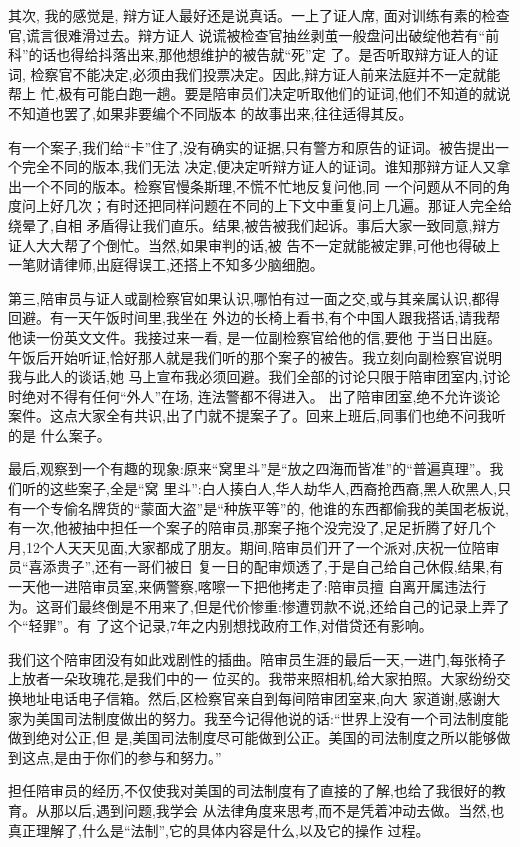 ﻿\documentclass[10pt]{article}
\begin{document}
{其次, 我的感觉是, 辩方证人最好还是说真话。一上了证人席, 面对训练有素的检查官,谎言很难滑过去。辩方证人
说谎被检查官抽丝剥茧一般盘问出破绽\myrule 他若有``前科''的话也得给抖落出来,那他想维护的被告就``死''定
了。是否听取辩方证人的证词, 检察官不能决定,必须由我们投票决定。因此,辩方证人前来法庭并不一定就能帮上
忙,极有可能白跑一趟。要是陪审员们决定听取他们的证词,他们不知道的就说不知道也罢了,如果非要编个不同版本
的故事出来,往往适得其反。

有一个案子,我们给``卡''住了,没有确实的证据,只有警方和原告的证词。被告提出一个完全不同的版本,我们无法
决定,便决定听辩方证人的证词。谁知那辩方证人又拿出一个不同的版本。检察官慢条斯理,不慌不忙地反复问他,同
一个问题从不同的角度问上好几次；有时还把同样问题在不同的上下文中重复问上几遍。那证人完全给绕晕了,自相
矛盾得让我们直乐。结果,被告被我们起诉。事后大家一致同意,辩方证人大大帮了个倒忙。当然,如果审判的话,被
告不一定就能被定罪,可他也得破上一笔财请律师,出庭得误工,还搭上不知多少脑细胞。

第三,陪审员与证人或副检察官如果认识,哪怕有过一面之交,或与其亲属认识,都得回避。有一天午饭时间里,我坐在
外边的长椅上看书,有个中国人跟我搭话,请我帮他读一份英文文件。我接过来一看, 是一位副检察官给他的信,要他
于当日出庭。午饭后开始听证,恰好那人就是我们听的那个案子的被告。我立刻向副检察官说明我与此人的谈话,她
马上宣布我必须回避。我们全部的讨论只限于陪审团室内,讨论时绝对不得有任何``外人''在场, 连法警都不得进入。
出了陪审团室,绝不允许谈论案件。这点大家全有共识,出了门就不提案子了。回来上班后,同事们也绝不问我听的是
什么案子。

最后,观察到一个有趣的现象:原来``窝里斗''是``放之四海而皆准''的``普遍真理''。我们听的这些案子,全是``窝
里斗'':白人揍白人,华人劫华人,西裔抢西裔,黑人砍黑人,只有一个专偷名牌货的``蒙面大盗''是``种族平等''的,
他谁的东西都偷我的美国老板说,有一次,他被抽中担任一个案子的陪审员,那案子拖个没完没了,足足折腾了好几个
月,12个人天天见面,大家都成了朋友。期间,陪审员们开了一个派对,庆祝一位陪审员``喜添贵子'',还有一哥们被日
复一日的配审烦透了,于是自己给自己休假,结果,有一天他一进陪审员室,来俩警察,喀嚓一下把他拷走了:陪审员擅
自离开属违法行为。这哥们最终倒是不用来了,但是代价惨重:惨遭罚款不说,还给自己的记录上弄了个``轻罪''。有
了这个记录,7年之内别想找政府工作,对借贷还有影响。

我们这个陪审团没有如此戏剧性的插曲。陪审员生涯的最后一天,一进门,每张椅子上放者一朵玫瑰花,是我们中的一
位买的。我带来照相机,给大家拍照。大家纷纷交换地址电话电子信箱。然后,区检察官亲自到每间陪审团室来,向大
家道谢,感谢大家为美国司法制度做出的努力。我至今记得他说的话:``世界上没有一个司法制度能做到绝对公正,但
是,美国司法制度尽可能做到公正。美国的司法制度之所以能够做到这点,是由于你们的参与和努力。''

担任陪审员的经历,不仅使我对美国的司法制度有了直接的了解,也给了我很好的教育。从那以后,遇到问题,我学会
从法律角度来思考,而不是凭着冲动去做。当然,也真正理解了,什么是``法制'',它的具体内容是什么,以及它的操作
过程。

}
\end{document}
